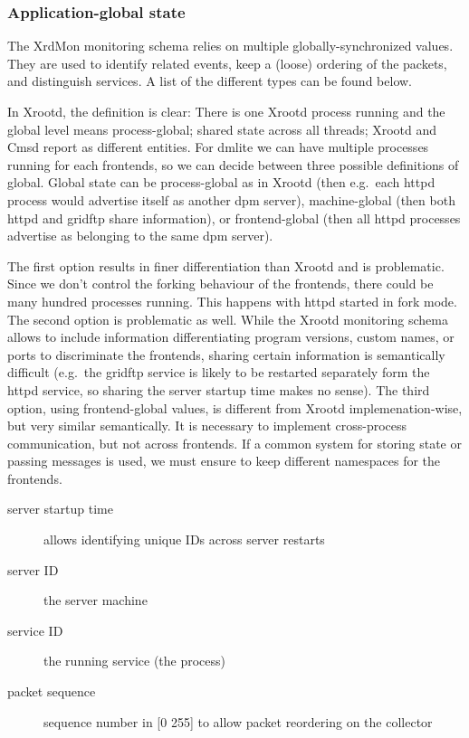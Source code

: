 \documentclass[12pt]{article} %
\begin{document}
\subsubsection{Application-global state}

The XrdMon monitoring schema relies on multiple globally-synchronized values. They are used to identify related events, keep a (loose) ordering of the packets, and distinguish services. A list of the different types can be found below.

In Xrootd, the definition is clear: There is one Xrootd process running and the global level means process-global; shared state across all threads; Xrootd and Cmsd report as different entities. For dmlite we can have multiple processes running for each frontends, so we can decide between three possible definitions of global. Global state can be process-global as in Xrootd (then e.g.\ each httpd process would advertise itself as another dpm server), machine-global (then both httpd and gridftp share information), or frontend-global (then all httpd processes advertise as belonging to the same dpm server).

The first option results in finer differentiation than Xrootd and is problematic. Since we don't control the forking behaviour of the frontends, there could be many hundred processes running. This happens with httpd started in fork mode. The second option is problematic as well. While the Xrootd monitoring schema allows to include information differentiating program versions, custom names, or ports to discriminate the frontends, sharing certain information is semantically difficult (e.g.\ the gridftp service is likely to be restarted separately form the httpd service, so sharing the server startup time makes no sense). The third option, using frontend-global values, is different from Xrootd implemenation-wise, but very similar semantically. It is necessary to implement cross-process communication, but not across frontends. If a common system for storing state or passing messages is used, we must ensure to keep different namespaces for the frontends.

\begin{description}
\item[server startup time] allows identifying unique IDs across server restarts
\item[server ID] the server machine
\item[service ID] the running service (the process)
\item[packet sequence] sequence number in [0 255] to allow packet reordering on the collector
\end{description}
\end{document}
